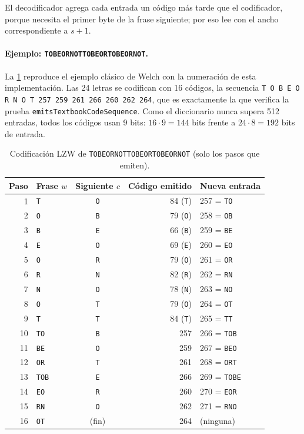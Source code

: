 El decodificador agrega cada entrada un código más tarde que el codificador, porque necesita
el primer byte de la frase siguiente; por eso lee con el ancho correspondiente a $s + 1$.

\paragraph{Ejemplo: \texttt{TOBEORNOTTOBEORTOBEORNOT}.} La \cref{tab:lzw-welch} reproduce el
ejemplo clásico de Welch con la numeración de esta implementación. Las 24 letras se codifican
con 16 códigos, la secuencia
\texttt{T O B E O R N O T 257 259 261 266 260 262 264}, que es exactamente la que verifica la
prueba \texttt{emitsTextbookCodeSequence}. Como el diccionario nunca supera 512 entradas, todos
los códigos usan 9 bits: $16 \cdot 9 = 144$ bits frente a $24 \cdot 8 = 192$ bits de entrada.

\begin{table}[H]
  \centering
  \caption{Codificación LZW de \texttt{TOBEORNOTTOBEORTOBEORNOT} (solo los pasos que emiten).}
  \label{tab:lzw-welch}
  \small
  \begin{tabular}{@{}r l c r l@{}}
    \toprule
    Paso & Frase $w$ & Siguiente $c$ & Código emitido & Nueva entrada \\
    \midrule
     1 & \texttt{T}   & \texttt{O} & 84 (\texttt{T}) & 257 = \texttt{TO} \\
     2 & \texttt{O}   & \texttt{B} & 79 (\texttt{O}) & 258 = \texttt{OB} \\
     3 & \texttt{B}   & \texttt{E} & 66 (\texttt{B}) & 259 = \texttt{BE} \\
     4 & \texttt{E}   & \texttt{O} & 69 (\texttt{E}) & 260 = \texttt{EO} \\
     5 & \texttt{O}   & \texttt{R} & 79 (\texttt{O}) & 261 = \texttt{OR} \\
     6 & \texttt{R}   & \texttt{N} & 82 (\texttt{R}) & 262 = \texttt{RN} \\
     7 & \texttt{N}   & \texttt{O} & 78 (\texttt{N}) & 263 = \texttt{NO} \\
     8 & \texttt{O}   & \texttt{T} & 79 (\texttt{O}) & 264 = \texttt{OT} \\
     9 & \texttt{T}   & \texttt{T} & 84 (\texttt{T}) & 265 = \texttt{TT} \\
    10 & \texttt{TO}  & \texttt{B} & 257 & 266 = \texttt{TOB} \\
    11 & \texttt{BE}  & \texttt{O} & 259 & 267 = \texttt{BEO} \\
    12 & \texttt{OR}  & \texttt{T} & 261 & 268 = \texttt{ORT} \\
    13 & \texttt{TOB} & \texttt{E} & 266 & 269 = \texttt{TOBE} \\
    14 & \texttt{EO}  & \texttt{R} & 260 & 270 = \texttt{EOR} \\
    15 & \texttt{RN}  & \texttt{O} & 262 & 271 = \texttt{RNO} \\
    16 & \texttt{OT}  & (fin)      & 264 & (ninguna) \\
    \bottomrule
  \end{tabular}
\end{table}

